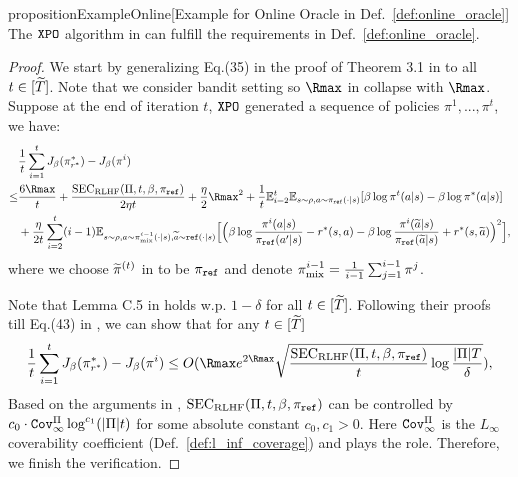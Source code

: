 \begin{restatable}{proposition}{ExampleOnline}[Example for Online Oracle in Def.~\ref{def:online_oracle}]\label{example:online_oracle}
    The ${\texttt{XPO}}$ algorithm in \citep{xie2024exploratory} can fulfill the requirements in Def.~\ref{def:online_oracle}.
\end{restatable}
\begin{proof}
    We start by generalizing Eq.(35) in the proof of Theorem 3.1 in \citep{xie2024exploratory} to all $t \in [{\widetilde{T}}]$. 
    Note that we consider bandit setting so ${\Rmax}$ in \citep{xie2024exploratory} collapse with ${\Rmax}$.
    Suppose at the end of iteration $t$, ${\texttt{XPO}}$ generated a sequence of policies $\pi^1,...,\pi^t$, we have:
    \begin{align*}
        &\frac{1}{t}\sum_{i=1}^t J_\beta(\pi^*_{r^*}) - J_\beta(\pi^i) \\
        \leq & \frac{6{\Rmax}}{t} + \frac{\text{SEC}_{\text{RLHF}}(\Pi,t,\beta,\pi_\textref)}{2\eta t} + \frac{\eta}{2}{\Rmax}^2 + \frac{1}{t} \EE_{i=2}^t \EE_{s\sim\rho,a\sim\pi_\textref(\cdot|s)}[\beta \log\pi^t(a|s) - \beta \log \pi^*(a|s)] \\
        & + \frac{\eta}{2t} \sum_{i=2}^t (i-1) \EE_{s\sim\rho,a\sim\pi_\mix^{i-1}(\cdot|s),\ta\sim\textref(\cdot|s)}\Big[\Big(\beta\log\frac{\pi^i(a|s)}{\pi_\textref(a'|s)} - r^*(s,a) - \beta\log\frac{\pi^i(\ta|s)}{\pi_\textref(\ta|s)} + r^*(s,\ta) \Big)^2\Big],
    \end{align*}
    where we choose $\widetilde{\pi}^{(t)}$ in \citep{xie2024exploratory} to be $\pi_{\texttt{ref}}$ and denote $\pi_{\text{mix}}^{i-1} = \frac{1}{i-1}\sum_{j=1}^{i-1} \pi^j$.

    Note that Lemma C.5 in \citep{xie2024exploratory} holds w.p. $1-\delta$ for all $t\in[{\widetilde{T}}]$. Following their proofs till Eq.(43) in \citep{xie2024exploratory}, we can show that for any $t\in[{\widetilde{T}}]$
    \begin{align*}
        \frac{1}{t}\sum_{i=1}^t J_\beta(\pi^*_{r^*}) - J_\beta(\pi^i) \leq O({\Rmax} e^{2{\Rmax}} \sqrt{\frac{\text{SEC}_{\text{RLHF}}(\Pi,t,\beta,\pi_\textref)}{t}\log\frac{|\Pi|T}{\delta}}),
    \end{align*}
    Based on the arguments in \citep{xie2024exploratory}, $\text{SEC}_{\text{RLHF}}(\Pi,t,\beta,\pi_{\texttt{ref}})$ can be controlled by $c_0 \cdot {\texttt{Cov}}_\infty^\Pi\log^{c_1}(|\Pi|t)$ for some absolute constant $c_0,c_1 > 0$. Here ${\texttt{Cov}}_\infty^\Pi$ is the $L_\infty$ coverability coefficient (Def.~\ref{def:l_inf_coverage}) and plays the role.
    Therefore, we finish the verification.
\end{proof}



